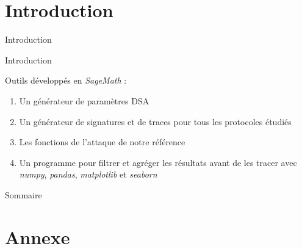 \documentclass{backend/backend}
\begin{document}
\begin{frame}
    \titlepage
\end{frame}

\section*{Introduction}
\showtoctrue %

\begin{frame}{Introduction}
    
\end{frame}

\begin{frame}{Introduction}
    
    Outils développés en \textit{SageMath} :

    \begin{enumerate}
        \item Un générateur de paramètres DSA
        \item Un générateur de signatures et de traces pour tous les protocoles étudiés
        \item Les fonctions de l'attaque de notre référence
        \item Un programme pour filtrer et agréger les résultats avant de les tracer avec \textit{numpy}, \textit{pandas}, \textit{matplotlib} et \textit{seaborn}
        
    \end{enumerate}
\end{frame}


\begin{frame}{Sommaire}

        \small
        \tableofcontents

\end{frame}





\section{Annexe}
\end{document}
